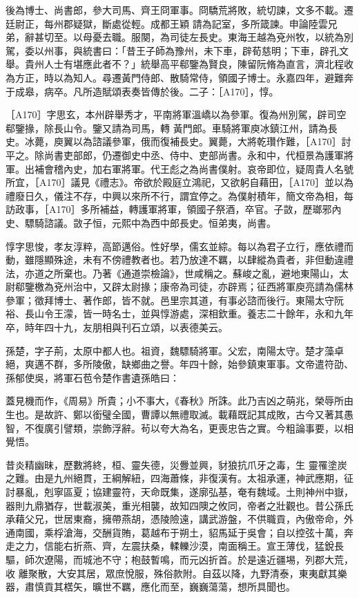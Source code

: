 \begin{pinyinscope}
 後為博士、尚書郎，參大司馬、齊王冏軍事。冏驕荒將敗，統切諫，文多不載。遷廷尉正，每州郡疑獄，斷處從輕。成都王穎
 請為記室，多所箴諫。申論陸雲兄弟，辭甚切至。以母憂去職。服闋，為司徒左長史。東海王越為兗州牧，以統為別駕，委以州事，與統書曰：「昔王子師為豫州，未下車，辟荀慈明；下車，辟孔文舉。貴州人士有堪應此者不？」統舉高平郗鑒為賢良，陳留阮脩為直言，濟北程收為方正，時以為知人。尋遷黃門侍郎、散騎常侍，領國子博士。永嘉四年，避難奔于成皋，病卒。凡所造賦頌表奏皆傳於後。二子：［A170］，惇。



 ［A170］字思玄，本州辟舉秀才，平南將軍溫嶠以為參軍。復為州別駕，辟司空郗鑒掾，除長山令。鑒又請為司馬，轉
 黃門郎。車騎將軍庾冰鎮江州，請為長史。冰薨，庾翼以為諮議參軍，俄而復補長史。翼薨，大將乾瓚作難，［A170］討平之。除尚書吏部郎，仍遷御史中丞、侍中、吏部尚書。永和中，代桓景為護軍將軍。出補會稽內史，加右軍將軍。代王彪之為尚書僕射。哀帝即位，疑周貴人名號所宜，［A170］議見《禮志》。帝欲於殿庭立鴻祀，又欲躬自藉田，［A170］並以為禮廢日久，儀注不存，中興以來所不行，謂宜停之。為僕射積年，簡文帝為相，每訪政事，［A170］多所補益，轉護軍將軍，領國子祭酒，卒官。子敳，歷瑯邪內史、驃騎諮議。敳子恒，元熙中為西中郎長史。恒弟夷，尚書。



 惇字思悛，孝友淳粹，高節邁俗。性好學，儒玄並綜。每以為君子立行，應依禮而動，雖隱顯殊途，未有不傍禮教者也。若乃放達不羈，以肆縱為貴者，非但動違禮法，亦道之所棄也。乃著《通道崇檢論》，世咸稱之。蘇峻之亂，避地東陽山，太尉郗鑒檄為兗州治中，又辟太尉掾；康帝為司徒，亦辟焉；征西將軍庾亮請為儒林參軍；徵拜博士、著作郎，皆不就。邑里宗其道，有事必諮而後行。東陽太守阮裕、長山令王濛，皆一時名士，並與惇游處，深相欽重。養志二十餘年，永和九年卒，時年四十九，友朋相與刊石立頌，以表德美云。



 孫楚，字子荊，太原中都人也。祖資，魏驃騎將軍。父宏，南陽太守。楚才藻卓絕，爽邁不群，多所陵傲，缺鄉曲之譽。年四十餘，始參鎮東軍事。文帝遣符劭、孫郁使吳，將軍石苞令楚作書遺孫皓曰：



 蓋見機而作，《周易》所貴；小不事大，《春秋》所誅。此乃吉凶之萌兆，榮辱所由生也。是故許、鄭以銜璧全國，曹譚以無禮取滅。載藉既記其成敗，古今又著其愚智，不復廣引譬類，崇飾浮辭。茍以夸大為名，更喪忠告之實。今粗論事要，以相覺悟。



 昔炎精幽昧，歷數將終，桓、靈失德，災釁並興，豺狼抗爪牙之毒，生
 靈罹塗炭之難。由是九州絕貫，王綱解紐，四海蕭條，非復漢有。太祖承運，神武應期，征討暴亂，剋寧區夏；協建靈符，天命既集，遂廓弘基，奄有魏域。土則神州中嶽，器則九鼎猶存，世載淑美，重光相襲，故知四隩之攸同，帝者之壯觀也。昔公孫氏承藉父兄，世居東裔，擁帶燕胡，憑陵險遠，講武游盤，不供職貢，內傲帝命，外通南國，乘桴滄海，交酬貨賄，葛越布于朔土，貂馬延于吳會；自以控弦十萬，奔走之力，信能右折燕、齊，左震扶桑，輮轢沙漠，南面稱王。宣王薄伐，猛銳長驅，師次遼陽，而城池不守；枹鼓暫鳴，而元凶折首。於是遠近疆埸，列郡大荒，收
 離聚散，大安其居，眾庶悅服，殊俗款附。自茲以降，九野清泰，東夷獻其樂器，肅慎貢其楛矢，曠世不羈，應化而至，巍巍蕩蕩，想所具聞也。




\end{pinyinscope}
